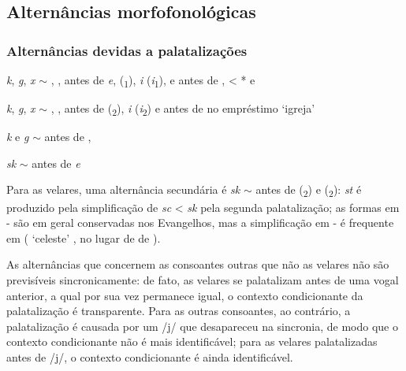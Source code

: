 \subsection{Alternâncias morfofonológicas}\label{sec:altmorfofon}

\subsubsection{Alternâncias devidas a palatalizações}

\begin{compactitem}[--]
	\item \emph{k}, \emph{g}, \emph{x} $\sim$ , , 
	antes de \emph{e},  (\textsubscript{1}), \emph{i}
	(\emph{i}\textsubscript{1}),  e antes de ,  <
	* e 
	\item \emph{k}, \emph{g}, \emph{x} $\sim$ , , 
	antes de  (\textsubscript{2}), \emph{i}
	(\emph{i}\textsubscript{2}) e antes de  no empréstimo
	 `igreja'
	\item \emph{k} e \emph{g} $\sim$  antes de , 
	\item \emph{sk} $\sim$  antes de \emph{e}
\end{compactitem}

Para as velares, uma alternância secundária é \emph{sk} $\sim$  antes
de  (\textsubscript{2}) e 
(\textsubscript{2}):
\emph{st} é produzido pela simplificação de \emph{sc} < \emph{sk} pela segunda
palatalização; as formas em - são em geral conservadas nos
Evangelhos, mas a simplificação em - é frequente em
 (
 `celeste'
, no lugar de  de
).

As alternâncias que concernem as consoantes outras que não as velares não são
previsíveis sincronicamente: de fato, as velares se palatalizam antes de uma
vogal anterior, a qual por sua vez permanece igual, o contexto condicionante da
palatalização é transparente.
Para as outras consoantes, ao contrário, a palatalização é causada por um /j/
que desapareceu na sincronia, de modo que o contexto condicionante não é mais
identificável; para as velares palatalizadas antes de /j/, o contexto
condicionante é ainda identificável.

